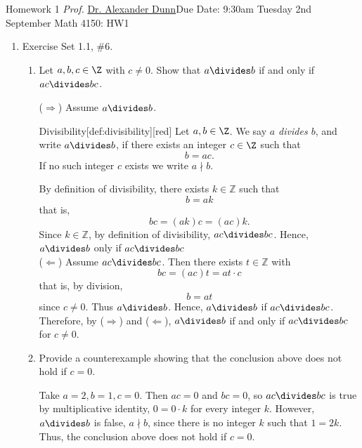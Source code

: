 \newpage{}
{Homework 1}
{\textit{Prof.} \href{https://alexjdunn.weebly.com/}{Dr. Alexander Dunn}}{Due Date: 9:30am Tuesday 2nd September}
{Math 4150: HW1}


\newpage


\begin{enumerate}
  \item Exercise Set 1.1, \#6.
  \begin{enumerate}
    \item Let $a,b, c\in \Z$ with $c\neq 0$. Show that $a\divides b$ if and only if $ac \divides bc$.
    \begin{subprove}
      ($\Rightarrow$) Assume $a\divides b$. 
      \begin{define}{Divisibility}[def:divisibility][red]
      Let $a,b\in\Z$. We say \emph{$a$ divides $b$}, and write $a\divides b$, if there exists an 
      integer $c\in\Z$ such that
      \[
      b = a c.
      \]
      If no such integer $c$ exists we write $a\nmid b$.
      \end{define}
      By definition of divisibility, there exists $k\in\mathbb{Z}$ such that
      \[
        b = a k
      \]
      that is,
      \[
        bc = (a k)c = (ac)k.
      \]
      Since $k\in\mathbb{Z}$, by definition of divisibility, $ac\divides bc$. 
      Hence, $a\divides b$ only if $ac \divides bc$\vspace*{10px}\\
      ($\Leftarrow$) Assume $ac\divides bc$. Then there exists $t\in\mathbb{Z}$ with
      \[
        bc = (ac)t = at\cdot c
      \]
      that is, by division,
      \[
        b = a t
      \]
      since $c\neq 0$.
      Thus $a\divides b$. Hence, $a\divides b$ if $ac \divides bc$.\vspace*{10px}\\
      Therefore, by ($\Rightarrow$) and ($\Leftarrow$), $a\divides b$ if and only if $ac \divides bc$ for $c\neq 0$.
    \end{subprove}

    \item Provide a counterexample showing that the conclusion above does not hold if $c = 0$.
    \begin{subanswer}
      Take $a=2, b=1, c=0$. Then $ac = 0$ and $bc=0$, so $ac\divides bc$ is true by 
      multiplicative identity, $0=0\cdot k$ for every integer $k$.
      However,  $a\divides b$ is false, $a\nmid b$, since there is no integer $k$ such that $1=2k$. 
      Thus, the conclusion above does not hold if $c = 0$.
    \end{subanswer}
  \end{enumerate}


\end{enumerate}
